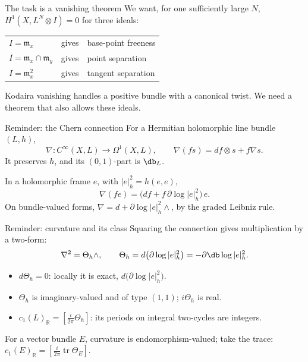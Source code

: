 \begin{frame}{The task is a vanishing theorem}
We want, for one sufficiently large \(N\),
\(H^1(X,L^N\otimes I)=0\) for three ideals:
\begin{center}
\renewcommand{\arraystretch}{1.6}
\begin{tabular}{lll}
\(I=\mathfrak m_x\) & gives & base-point freeness\\
\(I=\mathfrak m_x\cap\mathfrak m_y\) & gives & point separation\\
\(I=\mathfrak m_x^2\) & gives & tangent separation
\end{tabular}
\end{center}
Kodaira vanishing handles a positive bundle with a canonical twist.
We need a theorem that also allows these ideals.
\end{frame}

\begin{frame}{Reminder: the Chern connection}
For a Hermitian holomorphic line bundle \((L,h)\),
\[
\nabla:C^\infty(X,L)\longrightarrow\Omega^1(X,L),\qquad
\nabla(fs)=df\otimes s+f\nabla s.
\]
It preserves \(h\), and its \((0,1)\)-part is \(\db_L\).
\par\medskip
In a holomorphic frame \(e\), with \(|e|_h^2=h(e,e)\),
\[
\nabla(fe)=\bigl(df+f\,\partial\log|e|_h^2\bigr)\,e.
\]
On bundle-valued forms, \(\nabla=d+\partial\log|e|_h^2\wedge\), by the graded Leibniz rule.
\end{frame}

\begin{frame}{Reminder: curvature and its class}
Squaring the connection gives multiplication by a two-form:
\[
\nabla^2=\Theta_h\wedge,\qquad
\Theta_h=d\bigl(\partial\log|e|_h^2\bigr)=-\partial\db\log|e|_h^2.
\]
\begin{itemize}
\setlength{\itemsep}{8pt}
\item \(d\Theta_h=0\): locally it is exact, \(d\bigl(\partial\log|e|_h^2\bigr)\).
\item \(\Theta_h\) is imaginary-valued and of type \((1,1)\); \(i\Theta_h\) is real.
\item \(\displaystyle c_1(L)_{\mathbb R}=\left[\frac{i}{2\pi}\Theta_h\right]\):
its periods on integral two-cycles are integers.
\end{itemize}
\medskip
For a vector bundle \(E\), curvature is endomorphism-valued; take the trace:
\(\displaystyle c_1(E)_{\mathbb R}=\left[\frac{i}{2\pi}\operatorname{tr}\Theta_E\right]\).
\end{frame}


